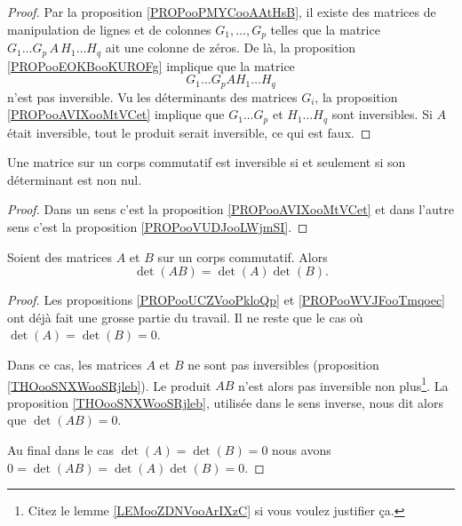 \begin{proof}
	Par la proposition \ref{PROPooPMYCooAAtHsB}, il existe des matrices de manipulation de lignes et de colonnes \( G_1,\ldots, G_p\)  telles que la matrice \( G_1\ldots G_p\,A\, H_1\ldots H_q\) ait une colonne de zéros. De là, la proposition \ref{PROPooEOKBooKUROFg} implique que la matrice
	\begin{equation}        \label{EQooQGXBooXxFOtb}
		G_1\ldots G_pA H_1\ldots H_q
	\end{equation}
	n'est pas inversible. Vu les déterminants des matrices \( G_i\),  la proposition \ref{PROPooAVIXooMtVCet} implique que \( G_1\ldots G_p\) et \( H_1\ldots H_q\) sont inversibles. Si \( A\) était inversible, tout le produit serait inversible, ce qui est faux.
\end{proof}

\begin{theorem}     \label{THOooSNXWooSRjleb}
	Une matrice sur un corps commutatif est inversible si et seulement si son déterminant est non nul.
\end{theorem}

\begin{proof}
	Dans un sens c'est la proposition \ref{PROPooAVIXooMtVCet} et dans l'autre sens c'est la proposition \ref{PROPooVUDJooLWjmSI}.
\end{proof}


\begin{proposition}     \label{PROPooHQNPooIfPEDH}
	Soient des matrices \( A\) et \( B\) sur un corps commutatif. Alors
	\begin{equation}
		\det(AB)=\det(A)\det(B).
	\end{equation}
\end{proposition}

\begin{proof}
	Les propositions \ref{PROPooUCZVooPkloQp} et \ref{PROPooWVJFooTmqoec} ont déjà fait une grosse partie du travail. Il ne reste que le cas où \( \det(A)=\det(B)=0\).

	Dans ce cas, les matrices \( A\) et \( B\) ne sont pas inversibles (proposition \ref{THOooSNXWooSRjleb}). Le produit \( AB\) n'est alors pas inversible non plus\footnote{Citez le lemme \ref{LEMooZDNVooArIXzC} si vous voulez justifier ça.}. La proposition \ref{THOooSNXWooSRjleb}, utilisée dans le sens inverse, nous dit alors que \( \det(AB)=0\).

	Au final dans le cas \( \det(A)=\det(B)=0\) nous avons \( 0=\det(AB)=\det(A)\det(B)=0\).
\end{proof}

